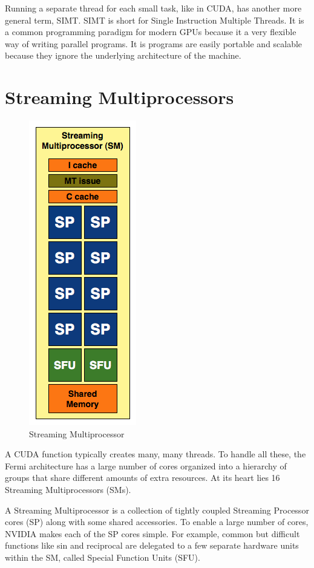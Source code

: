 \documentclass[../main/report.tex]{subfiles}
\begin{document}
Running a separate thread for each small task, like in CUDA, has another more general term, SIMT.
SIMT is short for Single Instruction Multiple Threads.
It is a common programming paradigm for modern GPUs because it a very flexible way of writing parallel programs.
It is programs are easily portable and scalable because they ignore the underlying architecture of the machine.

\section{Streaming Multiprocessors}

\begin{figure}
\centering
\includegraphics[scale=0.40]{../introduction/assets/SM.png}
\caption{Streaming Multiprocessor}
\label{fig:sm}
\end{figure}

A CUDA function typically creates many, many threads.
To handle all these, the Fermi architecture has a large number of cores organized into a hierarchy of groups that share different amounts of extra resources.
At its heart lies 16 Streaming Multiprocessors (SMs).

A Streaming Multiprocessor is a collection of tightly coupled Streaming Processor cores (SP) along with some shared accessories.
To enable a large number of cores, NVIDIA makes each of the SP cores simple.
For example, common but difficult functions like sin and reciprocal are delegated to a few separate hardware units within the SM, called Special Function Units (SFU).
\end{document}
